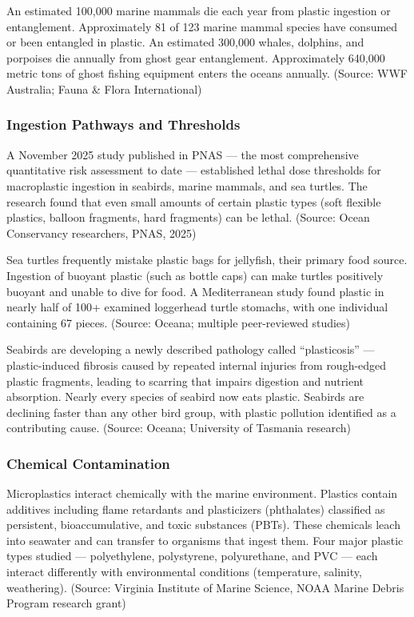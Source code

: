 \documentclass[11pt,letterpaper]{article}
\begin{document}
An estimated 100,000 marine mammals die each year from plastic ingestion or entanglement. Approximately 81 of 123 marine mammal species have consumed or been entangled in plastic. An estimated 300,000 whales, dolphins, and porpoises die annually from ghost gear entanglement. Approximately 640,000 metric tons of ghost fishing equipment enters the oceans annually. (Source: WWF Australia; Fauna \& Flora International)

\subsubsection{Ingestion Pathways and Thresholds}
A November 2025 study published in PNAS --- the most comprehensive quantitative risk assessment to date --- established lethal dose thresholds for macroplastic ingestion in seabirds, marine mammals, and sea turtles. The research found that even small amounts of certain plastic types (soft flexible plastics, balloon fragments, hard fragments) can be lethal. (Source: Ocean Conservancy researchers, PNAS, 2025)

Sea turtles frequently mistake plastic bags for jellyfish, their primary food source. Ingestion of buoyant plastic (such as bottle caps) can make turtles positively buoyant and unable to dive for food. A Mediterranean study found plastic in nearly half of 100+ examined loggerhead turtle stomachs, with one individual containing 67 pieces. (Source: Oceana; multiple peer-reviewed studies)

Seabirds are developing a newly described pathology called ``plasticosis'' --- plastic-induced fibrosis caused by repeated internal injuries from rough-edged plastic fragments, leading to scarring that impairs digestion and nutrient absorption. Nearly every species of seabird now eats plastic. Seabirds are declining faster than any other bird group, with plastic pollution identified as a contributing cause. (Source: Oceana; University of Tasmania research)

\subsubsection{Chemical Contamination}
Microplastics interact chemically with the marine environment. Plastics contain additives including flame retardants and plasticizers (phthalates) classified as persistent, bioaccumulative, and toxic substances (PBTs). These chemicals leach into seawater and can transfer to organisms that ingest them. Four major plastic types studied --- polyethylene, polystyrene, polyurethane, and PVC --- each interact differently with environmental conditions (temperature, salinity, weathering). (Source: Virginia Institute of Marine Science, NOAA Marine Debris Program research grant)
\end{document}
